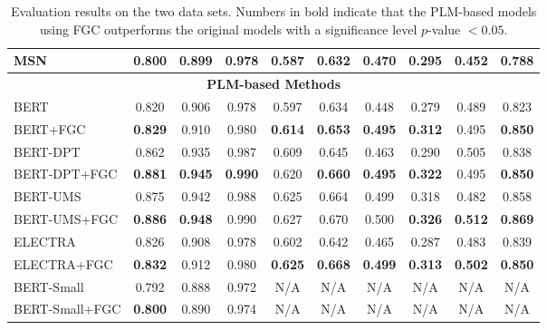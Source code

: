 \documentclass[letterpaper]{article} \usepackage{aaai22}  \usepackage{times}  \usepackage{helvet}  \usepackage{courier}  \usepackage[hyphens]{url}  \usepackage{graphicx} \urlstyle{rm} \def\UrlFont{\rm}  \usepackage{natbib}  \usepackage{caption} \DeclareCaptionStyle{ruled}{labelfont=normalfont,labelsep=colon,strut=off} \frenchspacing  \setlength{\pdfpagewidth}{8.5in}  \setlength{\pdfpageheight}{11in}  \usepackage{algorithm}
\begin{document}
\begin{table*}[htbp]
{\begin{tabular}{lccccccccc}
\multicolumn{1}{l|}{MSN~\cite{yuan2019multi}}                    & 0.800 & 0.899 & \multicolumn{1}{c|}{0.978} & 0.587 & 0.632 & 0.470 & 0.295 & 0.452 & 0.788 \\ \hline \hline
\multicolumn{10}{c}{\textbf{PLM-based Methods}}                                                                                                   \\ \hline
\multicolumn{1}{l|}{BERT}                   & 0.820 & 0.906 & \multicolumn{1}{c|}{0.978} & 0.597 & 0.634 & 0.448 & 0.279 & 0.489 & 0.823 \\
\multicolumn{1}{l|}{BERT+FGC}               & \textbf{0.829} & 0.910 & \multicolumn{1}{c|}{0.980} & \textbf{0.614} & \textbf{0.653} & \textbf{0.495} & \textbf{0.312} & 0.495 & \textbf{0.850} \\ \hline
\multicolumn{1}{l|}{BERT-DPT~\cite{whang2020domain}}               & 0.862 & 0.935 & \multicolumn{1}{c|}{0.987} & 0.609 & 0.645 & 0.463 & 0.290 & 0.505 & 0.838 \\
\multicolumn{1}{l|}{BERT-DPT+FGC}           & \textbf{0.881} & \textbf{0.945} & \multicolumn{1}{c|}{\textbf{0.990}} & 0.620 & \textbf{0.660} & \textbf{0.495} & \textbf{0.322} & 0.495 & \textbf{0.850} \\ \hline
\multicolumn{1}{l|}{BERT-UMS~\cite{whang2021ums}}               & 0.875 & 0.942 & \multicolumn{1}{c|}{0.988} & 0.625 & 0.664 & 0.499 & 0.318 & 0.482 & 0.858 \\
\multicolumn{1}{l|}{BERT-UMS+FGC}           & \textbf{0.886} & \textbf{0.948} & \multicolumn{1}{c|}{0.990} & 0.627 & 0.670 & 0.500 & \textbf{0.326} & \textbf{0.512} & \textbf{0.869} \\ \hline
\multicolumn{1}{l|}{ELECTRA}                & 0.826 & 0.908 & \multicolumn{1}{c|}{0.978} & 0.602 & 0.642 & 0.465 & 0.287 & 0.483 & 0.839 \\
\multicolumn{1}{l|}{ELECTRA+FGC}            & \textbf{0.832} & 0.912 & \multicolumn{1}{c|}{0.980} & \textbf{0.625} & \textbf{0.668} & \textbf{0.499} & \textbf{0.313} & \textbf{0.502} & \textbf{0.850} \\ \hline
\multicolumn{1}{l|}{BERT-Small}             & 0.792 & 0.888 & \multicolumn{1}{c|}{0.972} & N/A   & N/A   & N/A   & N/A   & N/A   & N/A   \\
\multicolumn{1}{l|}{BERT-Small+FGC}         & \textbf{0.800} & 0.890 & \multicolumn{1}{c|}{0.974} & N/A   & N/A   & N/A   & N/A   & N/A   & N/A   \\
\bottomrule
\end{tabular}

}
\caption{Evaluation results on the two data sets. Numbers in bold indicate that the PLM-based models using FGC outperforms the original models with a significance level $p$-value $<0.05$.} \label{table:result}
\end{table*} 
\end{document}

